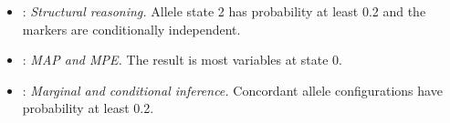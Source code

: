 \begingroup\raggedright
\begin{itemize}[nosep,leftmargin=*]
\item {}: \emph{Structural reasoning.}  Allele state 2 has probability at least 0.2 and the markers are conditionally independent.
\item {}: \emph{MAP and MPE.}  The result is most variables at state 0.
\item {}: \emph{Marginal and conditional inference.}  Concordant allele configurations have probability at least 0.2.
\end{itemize}
\endgroup

